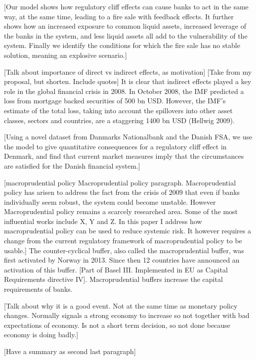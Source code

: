 \documentclass[11pt]{article}
\begin{document}
[Our model shows how regulatory cliff effects can cause banks to act in the same way, at the same time, leading to a fire sale with feedback effects. It further shows how an increased exposure to common liquid assets, increased leverage of the banks in the system, and less liquid assets all add to the vulnerability of the system. Finally we identify the conditions for which the fire sale has no stable solution, meaning an explosive scenario.]

[Talk about importance of direct vs indirect effects, as motivation]
[Take from my proposal, but shorten. Include quotes]
It is clear that indirect effects played a key role in the global financial crisis in 2008. In October 2008, the IMF predicted a loss from mortgage backed securities of 500 bn USD. However, the IMF’s estimate of the total loss, taking into account the spillovers into other asset classes, sectors and countries, are a staggering 1400 bn USD (Hellwig 2009).

[Using a novel dataset from Danmarks Nationalbank and the Danish FSA, we use the model to give quantitative consequences for a regulatory cliff effect in Denmark, and find that current market measures imply that the circumstances are satisfied for the Danish financial system.]


[macroprudential policy
Macroprudential policy paragraph. Macroprudential policy has arisen to address the fact from the crisis of 2009 that even if banks individually seem robust, the system could become unstable.
However Macroprudential policy remains a scarcely researched area. Some of the most influential works include X, Y and Z. In this paper I address how macroprudential policy can be used to reduce systemic risk. It however requires a change from the current regulatory framework of macroprudential policy to be usable.]
The counter-cyclical buffer, also called the macroprudential buffer, was first activated by Norway in 2013. Since then 12 countries have announced an activation of this buffer. [Part of Basel III. Implemented in EU as Capital Requirements directive IV]. Macroprudential buffers increase the capital requirements of banks.

[Talk about why it is a good event. Not at the same time as monetary policy changes. Normally signals a strong economy to increase so not together with bad expectations of economy. Is not a short term decision, so not done because economy is doing badly.]

[Have a summary as second last paragraph]
\end{document}
